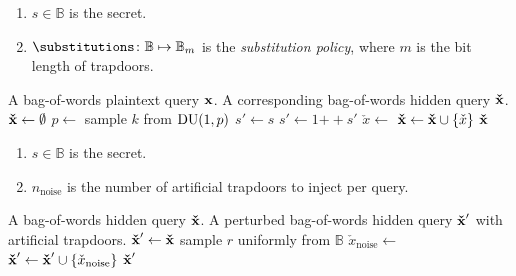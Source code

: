 \documentclass[final,11pt]{article}
\newcommand{\hqb}[1][]{%
   \ifthenelse{ \equal{#1}{} }
      {\ensuremath{\vec{\check{x}}}}
      {\ensuremath{\vec{\check{x}_{#1}}}}
}
\newcommand{\qb}[1][]{%
   \ifthenelse{ \equal{#1}{} }
      {\ensuremath{\vec{x}}}
      {\ensuremath{\vec{x_{#1}}}}
}
\newcommand{\catop}{{+\!\!+}}
\newcommand{\dudist}{\operatorname{\rm{DU}}}
\renewcommand{\vec}[1]{\boldsymbol{\mathbf{#1}}}
\newcommand{\cisb}{\mathbb{B}}
\numberwithin{equation}{section}
\theoremstyle{plain}
\theoremstyle{remark}
\begin{document}
\begin{algorithm}[h]
    \caption{Cryptographic substitution cipher policy for mapping plaintext queries to hidden queries}
    \label{alg:q_to_hq_subst}
    \parameters
    {
        \begin{enumerate}[noitemsep]
            \item $s \in \cisb$ is the secret.
            \item $\substitutions \colon \cisb \mapsto \cisb_m$ is the \emph{substitution policy}, where $m$ is the bit length of trapdoors.
        \end{enumerate}
    }
    \KwIn
    {
        A bag-of-words plaintext query $\qb$.
    }
    \KwOut
    {
        A corresponding bag-of-words hidden query $\hqb$.
    }
    \func{\HiddenQueryGenerator{$\qb$}}
    {
        $\hqb \gets \emptyset$\;
        \For{$x \in \qb$}
        {
            $p \gets$ \;
            sample $k$ from $\dudist(1,p)$\;
            $s' \gets s$\;
            {
                $s' \gets 1 \catop s'$\;
                $\check{x} \gets$ \hash{$x \catop s'$}\;
                $\hqb \gets \hqb \cup \{ \check{x} \}$\;
            }
        }
        \Return $\hqb$\;
    }
\end{algorithm}




\begin{algorithm}[h]
    \caption{Cryptographic noise policy decorator for hidden queries}
    \label{alg:q_to_hq_noise}
    \parameters
    {
        \begin{enumerate}[noitemsep]
            \item $s \in \cisb$ is the secret.
            \item $n_{\text{noise}}$ is the number of artificial trapdoors to inject per query.
        \end{enumerate}
    }
    \KwIn
    {
        A bag-of-words hidden query $\hqb$.
    }
    \KwOut
    {
        A perturbed bag-of-words hidden query $\hqb'$ with artificial trapdoors.
    }
    \func{\HiddenQueryNoiseDecorator{$\hqb$}}
    {
        $\hqb' \gets \hqb$\;
        {
            sample $r$ uniformly from $\cisb$\;
            $\check{x}_{\text{noise}} \gets$ \hash{$r \catop s$}\;
            $\hqb' \gets \hqb' \cup \{ \check{x}_{\text{noise}} \}$\;
        }
        \Return $\hqb'$\;
    }
\end{algorithm}
\end{document}
